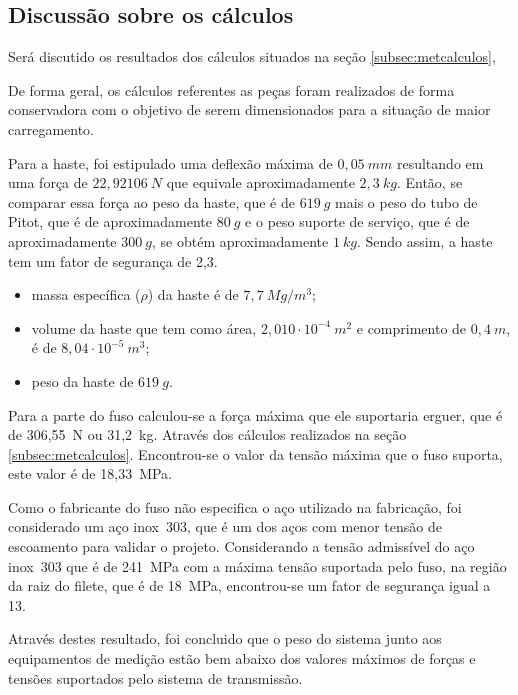 \subsection{Discussão sobre os cálculos}

Será discutido os resultados dos cálculos situados na seção \ref{subsec:metcalculos}, 

De forma geral, os cálculos referentes as peças foram realizados de forma conservadora 
com o objetivo de serem dimensionados para a situação de maior carregamento.

Para a haste, foi estipulado uma deflexão máxima de $0,05~mm$ resultando em uma força de $22,92106~N$ 
que equivale aproximadamente $2,3~kg$. Então, se comparar essa força ao peso da haste, que é de $619~g$ mais 
o peso do tubo de Pitot, que é de aproximadamente $80~g$ e o peso suporte de serviço, que é de aproximadamente 
$300~g$, se obtém aproximadamente $1~kg$. Sendo assim, a haste tem um fator de segurança de 2,3. 

\begin{itemize}
    \item massa específica ($\rho$) da haste é de $7,7~Mg/m^{3}$;
    \item volume da haste que tem como área, $2,010 \cdot 10^{-4}~m^{2}$ e comprimento de $0,4~m$, é de $8,04 \cdot 10^{-5}~m^{3}$;
    \item peso da haste de $619~g$. 
\end{itemize}

Para a parte do fuso calculou-se a força máxima que ele suportaria erguer, que é de 306,55~N ou 31,2~kg. 
Através dos cálculos realizados na seção \ref{subsec:metcalculos}. Encontrou-se o valor da tensão máxima 
que o fuso suporta, este valor é de 18,33~MPa.

Como o fabricante do fuso não especifica o aço utilizado na fabricação, foi considerado um aço inox~303, 
que é um dos aços com menor tensão de escoamento para validar o projeto. Considerando a tensão admissível 
do aço inox~303 que é de 241~MPa com a máxima tensão suportada pelo fuso, na região da raiz do filete, 
que é de 18~MPa, encontrou-se um fator de segurança igual a 13. 

Através destes resultado, foi concluido que o peso do sistema junto aos equipamentos de medição estão bem 
abaixo dos valores máximos de forças e tensões suportados pelo sistema de transmissão.





